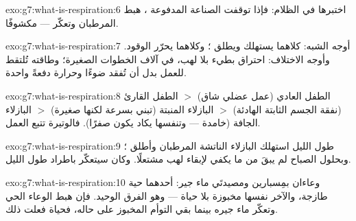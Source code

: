 \begin{solution}{exo:g7:what-is-respiration:6}
اختبرها في الظلام: فإذا توقفت الصناعة المدفوعة ، هبط 
المرطبان وتعكّر  ---  مكشوفًا.
\end{solution}

\begin{solution}{exo:g7:what-is-respiration:7}
أوجه الشبه: كلاهما يستهلك  ويطلق ؛
وكلاهما يحرّر  الوقود. وأوجه الاختلاف: احتراق  بطيء بلا
لهب، في آلاف الخطوات الصغيرة؛ وطاقته تُلتقط للعمل بدل أن تُفقد
ضوءًا وحرارة دفعةً واحدة.
\end{solution}

\begin{solution}{exo:g7:what-is-respiration:8}
الطفل العادي (عمل عضلي شاق) $>$ الطفل القارئ (نفقة الجسم الثابتة
الهادئة) $>$ البازلاء المنبتة (تبني بسرعة لكنها صغيرة) $>$
البازلاء الجافة (خامدة --- وتنفسها يكاد يكون صفرًا). فالوتيرة تتبع
العمل.
\end{solution}

\begin{solution}{exo:g7:what-is-respiration:9}
طول الليل استهلك  البازلاء الناتشة  المرطبان وأطلق ؛ وبحلول الصباح لم يبقَ من  ما يكفي لإبقاء
لهب مشتعلًا. وكان  سيتعكّر باطراد طول الليل.
\end{solution}

\begin{solution}{exo:g7:what-is-respiration:10}
وعاءان بمِسبارين ومصيدتَي ماء جير: أحدهما  حية طازجة، والآخر
 نفسها مخبوزة بلا حياة --- وهو الفرق الوحيد. فإن هبط 
الوعاء الحي وتعكّر ماء جيره بينما بقي التوأم المخبوز على حاله،
فحياة  فعلت ذلك.
\end{solution}

